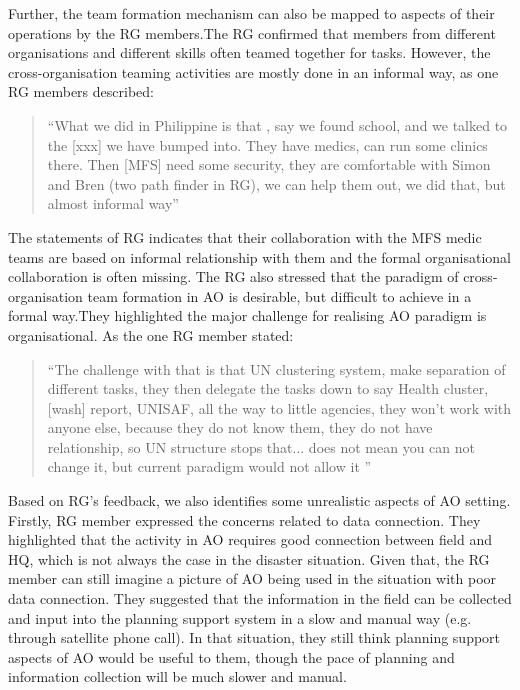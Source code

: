 Further, the team formation mechanism can also be mapped to aspects of their operations by the RG members.The RG confirmed that members from different organisations and different skills often teamed together for tasks. However, the cross-organisation teaming activities are mostly done in an informal way, as one RG members described: \\

\begin{quotation}
``What we did in Philippine is that , say we found school, and we talked to the [xxx] we have bumped into. They have medics, can run some clinics there. Then [MFS] need some security, they are comfortable with Simon and Bren (two path finder in RG), we can help them out, we did that, but almost informal way'' \\
\end{quotation}

The statements of RG indicates that their collaboration with the MFS medic teams are based on informal  relationship with them and the formal organisational collaboration is often missing. The RG also stressed that the paradigm of cross-organisation team formation in AO is desirable, but difficult to achieve in a formal way.They highlighted the major challenge for realising AO paradigm is organisational. As the one RG member stated:\\

\begin{quotation}
``The challenge with that is that UN clustering system, make separation of different tasks, they then delegate the tasks down to say Health cluster, [wash] report, UNISAF, all the way to little agencies, they won't work with anyone else, because they do not know them, they do not have relationship, so UN structure stops that... does not mean you can not change it, but current paradigm would not allow it ''
\end{quotation}

Based on RG's feedback, we also identifies some unrealistic aspects of AO setting. Firstly, RG member expressed the concerns related to data connection. They highlighted that the activity in AO requires good connection between field and HQ, which is not always the case in the disaster situation. Given that, the RG member can still imagine a picture of AO being used in the situation with poor data connection. They suggested that the information in the field can be collected and input into the planning support system in a slow and manual way (e.g. through satellite phone call). In that situation, they still think planning support aspects of AO would be useful to them, though the pace of planning and information collection will be much slower and manual. \\


